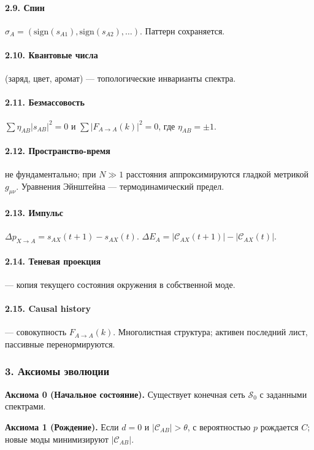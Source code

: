 \documentclass[12pt,a4paper]{article}
\begin{document}
\paragraph{2.9. Спин} $\sigma_A = (\text{sign}(s_{A1}), \text{sign}(s_{A2}), \dots)$. Паттерн сохраняется.
\paragraph{2.10. Квантовые числа} (заряд, цвет, аромат) --- топологические инварианты спектра.
\paragraph{2.11. Безмассовость} $\sum \eta_{AB} |s_{AB}|^2 = 0$ и $\sum |F_{A \to A}(k)|^2 = 0$, где $\eta_{AB} = \pm 1$.
\paragraph{2.12. Пространство-время} не фундаментально; при $N \gg 1$ расстояния аппроксимируются гладкой метрикой $g_{\mu\nu}$. Уравнения Эйнштейна --- термодинамический предел.
\paragraph{2.13. Импульс} $\Delta p_{X \to A} = s_{AX}(t+1) - s_{AX}(t)$. $\Delta E_A = |\mathcal{C}_{AX}(t+1)| - |\mathcal{C}_{AX}(t)|$.
\paragraph{2.14. Теневая проекция} --- копия текущего состояния окружения в собственной моде.
\paragraph{2.15. Causal history} --- совокупность $F_{A \to A}(k)$. Многолистная структура; активен последний лист, пассивные перенормируются.

\subsubsection{3. Аксиомы эволюции}

\textbf{Аксиома 0 (Начальное состояние).} Существует конечная сеть $\mathcal{S}_0$ с заданными спектрами.

\textbf{Аксиома 1 (Рождение).} Если $d=0$ и $|\mathcal{C}_{AB}| > \theta$, с вероятностью $p$ рождается $C$; новые моды минимизируют $|\mathcal{C}_{AB}|$.
\end{document}
